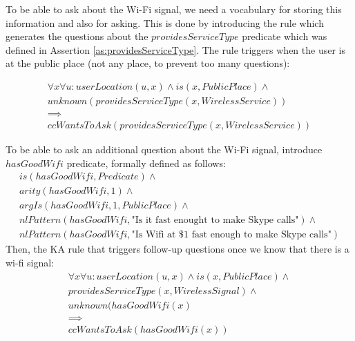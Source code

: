 To be able to ask about the Wi-Fi signal, we need a vocabulary for storing this
information and also for asking. This is done by introducing the rule which
generates the questions about the $providesServiceType$ predicate which was
defined in Assertion \ref{as:providesServiceType}. The rule triggers
when the user is at the public place (not any place, to prevent too many questions):

\begin{equation}\label{rule:haswifi}
\begin{gathered}
	\forall x\forall u: userLocation(u,x) \land
	is (x,PublicPlace) \land \\
	unknown(providesServiceType(x,WirelessService))\\
	\implies \\
	ccWantsToAsk(providesServiceType(x,WirelessService))
\end{gathered}
\end{equation}

\begin{definition}\label{def:hasGoodWifi}
To be able to ask an additional question about the Wi-Fi signal, introduce 
$hasGoodWifi$ predicate, formally defined as follows:
\begin{equation}\label{as:hasGoodWifi}
\begin{gathered}
	is(hasGoodWifi, Predicate) \land \\
	arity(hasGoodWifi,1) \land \\
	argIs(hasGoodWifi,1,PublicPlace) \land \\
	nlPattern(hasGoodWifi,\text{"Is it fast enought to make Skype calls"})\land\\
	nlPattern(hasGoodWifi,\text{"Is Wifi at \$1 fast enough to make Skype calls"})
\end{gathered}
\end{equation}
Then, the KA rule that triggers follow-up questions once we know that there
is a wi-fi signal:
\begin{equation}\label{rule:hasGoodWifi}
\begin{gathered}
	\forall x\forall u: userLocation(u,x) \land
	is (x,PublicPlace) \land \\
	providesServiceType(x,WirelessSignal) \land \\
	unknown(hasGoodWifi(x) \\
	\implies \\
	ccWantsToAsk(hasGoodWifi(x))
\end{gathered}
\end{equation}
\end{definition}

